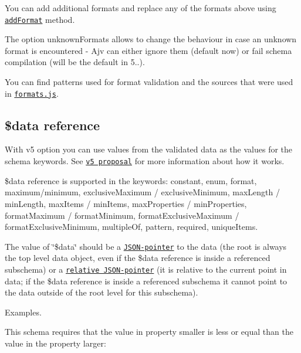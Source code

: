 You can add additional formats and replace any of the formats above using \href{#api-addformat}{\tt add\+Format} method.

The option {\ttfamily unknown\+Formats} allows to change the behaviour in case an unknown format is encountered -\/ Ajv can either ignore them (default now) or fail schema compilation (will be the default in 5..).

You can find patterns used for format validation and the sources that were used in \href{https://github.com/epoberezkin/ajv/blob/master/lib/compile/formats.js}{\tt formats.\+js}.

\subsection*{\$data reference}

With {\ttfamily v5} option you can use values from the validated data as the values for the schema keywords. See \href{https://github.com/json-schema/json-schema/wiki/$data-(v5-proposal)}{\tt v5 proposal} for more information about how it works.

{\ttfamily \$data} reference is supported in the keywords\+: constant, enum, format, maximum/minimum, exclusive\+Maximum / exclusive\+Minimum, max\+Length / min\+Length, max\+Items / min\+Items, max\+Properties / min\+Properties, format\+Maximum / format\+Minimum, format\+Exclusive\+Maximum / format\+Exclusive\+Minimum, multiple\+Of, pattern, required, unique\+Items.

The value of \char`\"{}\$data\char`\"{} should be a \href{https://tools.ietf.org/html/rfc6901}{\tt J\+S\+O\+N-\/pointer} to the data (the root is always the top level data object, even if the \$data reference is inside a referenced subschema) or a \href{http://tools.ietf.org/html/draft-luff-relative-json-pointer-00}{\tt relative J\+S\+O\+N-\/pointer} (it is relative to the current point in data; if the \$data reference is inside a referenced subschema it cannot point to the data outside of the root level for this subschema).

Examples.

This schema requires that the value in property {\ttfamily smaller} is less or equal than the value in the property larger\+:




